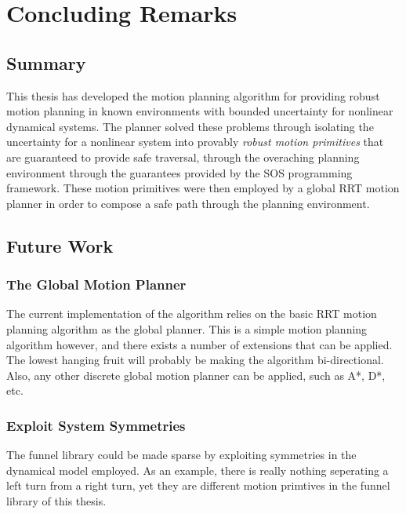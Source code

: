 \chapter{Concluding Remarks}
\label{chp:concluding-remarks}

\section{Summary}

This thesis has developed the \rrtfunnel{} motion planning algorithm for
providing robust motion planning in known environments with bounded uncertainty
for nonlinear dynamical systems. The planner solved these problems through
isolating the uncertainty for a nonlinear system into provably \textit{robust
  motion primitives} that are guaranteed to provide safe traversal, through the
overaching planning environment through the guarantees provided by the \ac{SOS}
programming framework. These motion primitives were then employed by a global
\ac{RRT} motion planner in order to compose a safe path through the planning
environment.

\section{Future Work}

\subsection{The Global Motion Planner}

The current implementation of the \rrtfunnel{} algorithm relies on the basic
\ac{RRT} motion planning algorithm as the global planner. This is a simple
motion planning algorithm however, and there exists a number of extensions that
can be applied. The lowest hanging fruit will probably be making the algorithm
bi-directional. Also, any other discrete global motion planner can be applied,
such as A*, D*, etc.

\subsection{Exploit System Symmetries}

The funnel library could be made sparse by exploiting symmetries in the
dynamical model employed. As an example, there is really nothing seperating a
left turn from a right turn, yet they are different motion primtives in the
funnel library of this thesis.


